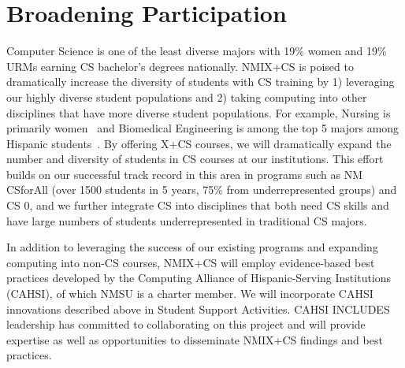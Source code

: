 \section{Broadening Participation}
Computer Science is one of the least diverse majors with 19\% women and 19\% URMs earning CS bachelor's degrees nationally. NMIX+CS is poised to dramatically increase the diversity of students with CS training by 1) leveraging our highly diverse student populations and 2) taking computing into other disciplines that have more diverse student populations. For example, Nursing is primarily women~\cite{nursing} and Biomedical Engineering  is among the top 5 majors among Hispanic students~\cite{biomed}. By offering X+CS courses, we will dramatically expand the number and diversity of students in CS courses at our institutions. This effort builds on our successful track record in this area in programs such as NM CSforAll (over 1500 students in 5 years, 75\% from underrepresented groups) and CS 0,
and we further integrate CS into disciplines that both need CS skills and have large numbers of students underrepresented in traditional CS majors. 

In addition to leveraging the success of our existing programs and expanding computing into non-CS courses, NMIX+CS will employ evidence-based best practices developed by the Computing Alliance of Hispanic-Serving Institutions (CAHSI), of which NMSU is a charter member. We will incorporate CAHSI innovations described above in Student Support Activities. CAHSI INCLUDES leadership has committed to collaborating on this project and will provide expertise as well as opportunities to disseminate NMIX+CS findings and best practices.  




